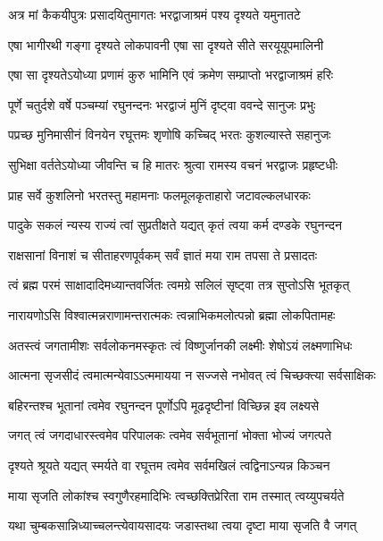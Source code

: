 \twolineshloka
{अत्र मां कैकयीपुत्रः प्रसादयितुमागतः}
{भरद्वाजाश्रमं पश्य दृश्यते यमुनातटे} %

\twolineshloka
{एषा भागीरथी गङ्गा दृश्यते लोकपावनी}
{एषा सा दृश्यते सीते सरयूयूपमालिनी} %

\twolineshloka
{एषा सा दृश्यतेऽयोध्या प्रणामं कुरु भामिनि}
{एवं क्रमेण सम्प्राप्तो भरद्वाजाश्रमं हरिः} %

\twolineshloka
{पूर्णे चतुर्दशे वर्षे पञ्चम्यां रघुनन्दनः}
{भरद्वाजं मुनिं दृष्ट्वा ववन्दे सानुजः प्रभुः} %

\twolineshloka
{पप्रच्छ मुनिमासीनं विनयेन रघूत्तमः}
{शृणोषि कच्चिद् भरतः कुशल्यास्ते सहानुजः} %

\twolineshloka
{सुभिक्षा वर्ततेऽयोध्या जीवन्ति च हि मातरः}
{श्रुत्वा रामस्य वचनं भरद्वाजः प्रहृष्टधीः} %

\twolineshloka
{प्राह सर्वे कुशलिनो भरतस्तु महामनाः}
{फलमूलकृताहारो जटावल्कलधारकः} %

\twolineshloka
{पादुके सकलं न्यस्य राज्यं त्वां सुप्रतीक्षते}
{यद्यत् कृतं त्वया कर्म दण्डके रघुनन्दन} %

\twolineshloka
{राक्षसानां विनाशं च सीताहरणपूर्वकम्}
{सर्वं ज्ञातं मया राम तपसा ते प्रसादतः} %

\twolineshloka
{त्वं ब्रह्म परमं साक्षादादिमध्यान्तवर्जितः}
{त्वमग्रे सलिलं सृष्ट्वा तत्र सुप्तोऽसि भूतकृत्} %

\twolineshloka
{नारायणोऽसि विश्वात्मन्नराणामन्तरात्मकः}
{त्वन्नाभिकमलोत्पन्नो ब्रह्मा लोकपितामहः} %

\twolineshloka
{अतस्त्वं जगतामीशः सर्वलोकनमस्कृतः}
{त्वं विष्णुर्जानकी लक्ष्मीः शेषोऽयं लक्ष्मणाभिधः} %

\twolineshloka
{आत्मना सृजसीदं त्वमात्मन्येवाऽऽत्ममायया}
{न सज्जसे नभोवत् त्वं चिच्छक्त्या सर्वसाक्षिकः} %

\twolineshloka
{बहिरन्तश्च भूतानां त्वमेव रघुनन्दन}
{पूर्णोऽपि मूढदृष्टीनां विच्छिन्न इव लक्ष्यसे} %

\twolineshloka
{जगत् त्वं जगदाधारस्त्वमेव परिपालकः}
{त्वमेव सर्वभूतानां भोक्ता भोज्यं जगत्पते} %

\twolineshloka
{दृश्यते श्रूयते यद्यत् स्मर्यते वा रघूत्तम}
{त्वमेव सर्वमखिलं त्वद्विनाऽन्यन्न किञ्चन} %

\twolineshloka
{माया सृजति लोकांश्च स्वगुणैरहमादिभिः}
{त्वच्छक्तिप्रेरिता राम तस्मात् त्वय्युपचर्यते} %

\twolineshloka
{यथा चुम्बकसान्निध्याच्चलन्त्येवायसादयः}
{जडास्तथा त्वया दृष्टा माया सृजति वै जगत्} %

